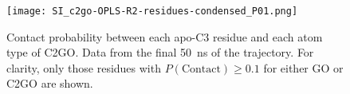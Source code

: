 \begin{figure}
    \centering
    \texttt{[image: SI\_c2go-OPLS-R2-residues-condensed\_P01.png]}
    \caption{Contact probability between each apo-C3 residue and each atom type of C2GO. Data from the final \SI{50}{\nano\second} of the trajectory. For clarity, only those residues with $P(\mathrm{Contact}) \geq 0.1$ for either GO or C2GO are shown.}
    \label{fig:prot-c2go-contacts}
\end{figure}
